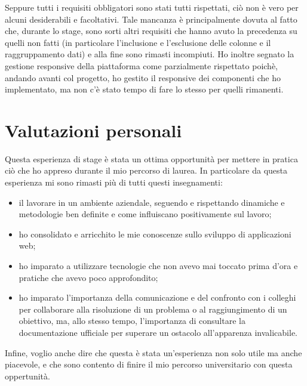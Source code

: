 \noindent Seppure tutti i requisiti obbligatori sono stati tutti rispettati, ciò non è vero per alcuni desiderabili e facoltativi. Tale mancanza è principalmente dovuta al fatto che, durante lo stage, sono sorti altri requisiti che hanno avuto la precedenza su quelli non fatti (in particolare l'inclusione e l'esclusione delle colonne e il raggruppamento dati) e alla fine sono rimasti incompiuti. Ho inoltre segnato la gestione responsive della piattaforma come parzialmente rispettato poichè, andando avanti col progetto, ho gestito il responsive dei componenti che ho implementato, ma non c'è stato tempo di fare lo stesso per quelli rimanenti. 
\section{Valutazioni personali}
Questa esperienza di stage è stata un ottima opportunità per mettere in pratica ciò che ho appreso durante il mio percorso di laurea.
In particolare da questa esperienza mi sono rimasti più di tutti questi insegnamenti:
\begin{itemize}
  \item il lavorare in un ambiente aziendale, seguendo  e rispettando dinamiche e metodologie ben definite e come influiscano positivamente sul lavoro;
  \item ho consolidato e arricchito le mie conoscenze sullo sviluppo di applicazioni web;
  \item ho imparato a utilizzare tecnologie che non avevo mai toccato prima d'ora e pratiche che avevo poco approfondito;
  \item ho imparato l'importanza della comunicazione e del confronto con i colleghi per collaborare alla risoluzione di un problema o al raggiungimento di un obiettivo, ma, allo stesso tempo, l'importanza di consultare la documentazione ufficiale per superare un ostacolo all'apparenza invalicabile.
\end{itemize}

\noindent Infine, voglio anche dire che questa è stata un'esperienza non solo utile ma anche piacevole, e che sono contento di finire il mio percorso universitario con questa oppertunità.